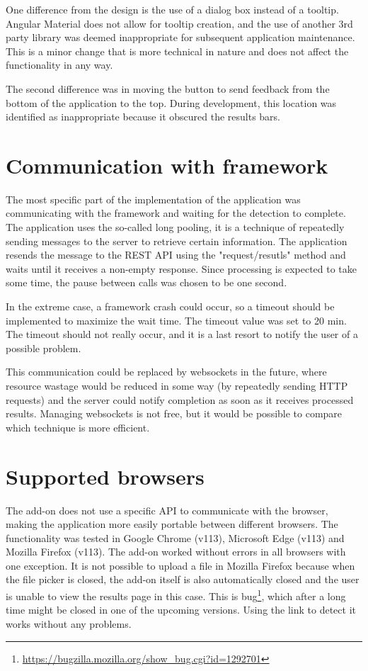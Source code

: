 One difference from the design is the use of a dialog box instead of a tooltip. Angular Material does not allow for tooltip creation, and the use of another 3rd party library was deemed inappropriate for subsequent application maintenance. This is a minor change that is more technical in nature and does not affect the functionality in any way.

The second difference was in moving the button to send feedback from the bottom of the application to the top. During development, this location was identified as inappropriate because it obscured the results bars.

\section{Communication with framework}

The most specific part of the implementation of the application was communicating with the framework and waiting for the detection to complete. The application uses the so-called long pooling, it is a technique of repeatedly sending messages to the server to retrieve certain information. The application resends the message to the REST API using the "request/resutls" method and waits until it receives a non-empty response. Since processing is expected to take some time, the pause between calls was chosen to be one second. 

In the extreme case, a framework crash could occur, so a timeout should be implemented to maximize the wait time. The timeout value was set to 20 min. The timeout should not really occur, and it is a last resort to notify the user of a possible problem.

This communication could be replaced by websockets in the future, where resource wastage would be reduced in some way (by repeatedly sending HTTP requests) and the server could notify completion as soon as it receives processed results. Managing websockets is not free, but it would be possible to compare which technique is more efficient. 

\section{Supported browsers}

The add-on does not use a specific API to communicate with the browser, making the application more easily portable between different browsers. The functionality was tested in Google Chrome (v113), Microsoft Edge (v113) and Mozilla Firefox (v113). The add-on worked without errors in all browsers with one exception. It is not possible to upload a file in Mozilla Firefox because when the file picker is closed, the add-on itself is also automatically closed and the user is unable to view the results page in this case. This is bug\footnote{\url{https://bugzilla.mozilla.org/show_bug.cgi?id=1292701}}, which after a long time might be closed in one of the upcoming versions. Using the link to detect it works without any problems. 

